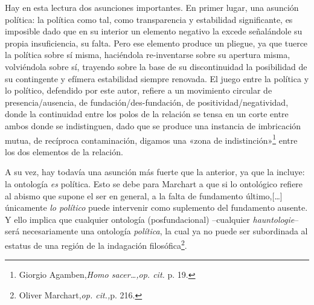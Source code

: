 Hay en esta lectura dos asunciones importantes. En primer lugar, una asunción política: la política como tal, como transparencia y estabilidad significante, es imposible dado que en su interior un elemento negativo la excede señalándole su propia insuficiencia, su falta. Pero ese elemento produce un pliegue, ya que tuerce la política sobre sí misma, haciéndola re-inventarse sobre su apertura misma, volviéndola sobre sí, trayendo sobre la base de su discontinuidad la posibilidad de su contingente y efímera estabilidad siempre renovada. El juego entre la política y lo político, defendido por este autor, refiere a un movimiento circular de presencia/ausencia, de fundación/des-fundación, de positividad/negatividad, donde la continuidad entre los polos de la relación se tensa en un corte entre ambos donde se indistinguen, dado que se produce una instancia de imbricación mutua, de recíproca contaminación, digamos una «zona de indistinción»\footnote{Giorgio Agamben,\emph{Homo sacer\ldots,op. cit.} p. 19.} entre los dos elementos de la relación.

A su vez, hay todavía una asunción más fuerte que la anterior, ya que la incluye: la ontología \emph{es} política. Esto se debe para Marchart a que si lo ontológico refiere al abismo que supone el ser en general, a la falta de fundamento último,{[}\ldots{]} únicamente \emph{lo político} puede intervenir como suplemento del fundamento ausente. Y ello implica que cualquier ontología (posfundacional) --cualquier \emph{hauntologie}-- será necesariamente una ontología \emph{política}, la cual ya no puede ser subordinada al estatus de una región de la indagación filosófica\footnote{Oliver Marchart,\emph{op. cit.,}p. 216.}.

